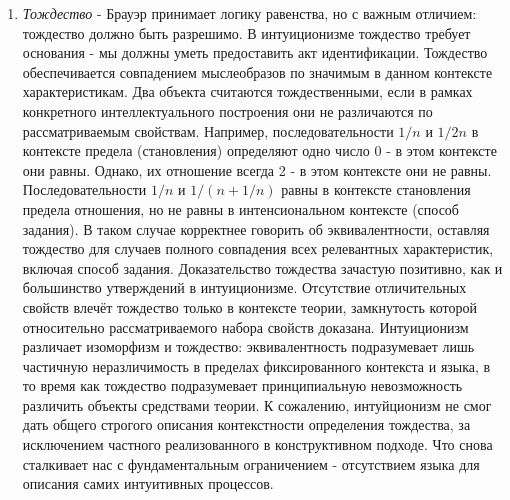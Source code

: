 \documentclass[12pt]{article}
\begin{document}
\begin{enumerate}
    \item {\it Тождество} - Брауэр принимает логику равенства, но с важным отличием: тождество должно быть разрешимо. В интуиционизме тождество требует основания - мы должны уметь предоставить акт идентификации. Тождество обеспечивается совпадением мыслеобразов по значимым в данном контексте характеристикам. Два объекта считаются тождественными, если в рамках конкретного интеллектуального построения они не различаются по рассматриваемым свойствам. Например, последовательности $1/n$ и $1/2n$ в контексте предела (становления) определяют одно число 0 - в этом контексте они равны. Однако, их отношение всегда 2 - в этом контексте они не равны. Последовательности $1/n$ и $1/(n + 1/n)$ равны в контексте становления предела отношения, но не равны в интенсиональном контексте (способ задания).  В таком случае корректнее говорить об эквивалентности, оставляя тождество для случаев полного совпадения всех релевантных характеристик, включая способ задания. Доказательство тождества зачастую позитивно, как и большинство утверждений в интуиционизме. Отсутствие отличительных свойств влечёт тождество только в контексте теории, замкнутость которой относительно рассматриваемого набора свойств доказана. Интуиционизм различает изоморфизм и тождество: эквивалентность подразумевает лишь частичную неразличимость в пределах фиксированного контекста и языка, в то время как тождество подразумевает принципиальную невозможность различить объекты средствами теории. К сожалению, интуйционизм не смог дать общего строгого описания контекстности определения тождества, за исключением частного реализованного в конструктивном подходе. Что снова сталкивает нас с фундаментальным ограничением - отсутствием языка для описания самих интуитивных процессов.

\end{enumerate}
\end{document}
